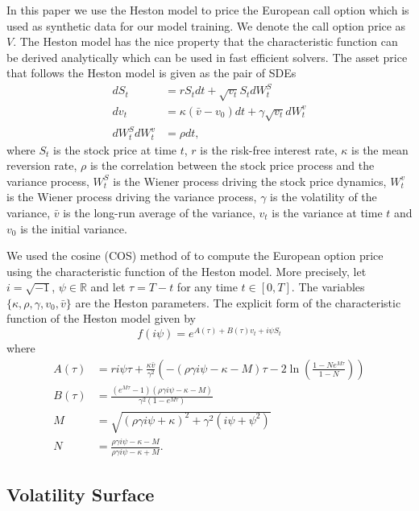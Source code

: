 \documentclass{article}
\theoremstyle{plain}%
\theoremstyle{definition}
\theoremstyle{remark}
\begin{document}
In this paper we use the Heston model to price the European call option which is used as synthetic data for our model training. We denote the call option price as $V$. The Heston model has the nice property that the characteristic function can be derived analytically which can be used in fast efficient solvers.  The asset price that follows the Heston model is given as the pair of SDEs \citep{heston-1993}
\begin{align*}
    dS_t &= r S_tdt +\sqrt{v_t}S_tdW_{t}^S \\
    dv_t &= \kappa(\bar{v} - v_0)dt +\gamma\sqrt{v_t}dW_{t}^v \\
    dW_{t}^S dW_{t}^v &=\rho dt,
\end{align*}
where $S_t$ is the stock price at time $t$, $r$ is the risk-free interest rate, $\kappa$ is the mean reversion rate, $\rho$ is the correlation between the stock price process and the variance process, $W_t^S$ is the Wiener process driving the stock price dynamics, $W_t^v$ is the Wiener process driving the variance process, $\gamma$ is the volatility of the variance, $\bar{v}$ is the long-run average of the variance, $v_t$ is the variance at time $t$ and $v_0$ is the initial variance.

We used the cosine (COS) method of \citep{fang-2009} to compute the European option price using the characteristic function of the Heston model. More precisely, let $i=\sqrt{-1}$, $\psi\in\mathbb{R}$ and let $\tau= T-t$ for any time $t\in[0,T]$.  The variables $\{\kappa,\rho,\gamma,v_0,\bar{v}\}$ are the Heston parameters. The explicit form of the characteristic function of the Heston model given by \citep{dunn-2014}
\[
    f(i\psi) = e^{A(\tau)+B(\tau)v_t+i\psi S_t}
\]
where
\begin{align*}
    A(\tau) &= ri\psi\tau + \frac{\kappa\bar{v}}{\gamma^2}\left(-(\rho\gamma i\psi-\kappa-M)\tau-2\ln\left(\frac{1-Ne^{M\tau}}{1-N}\right)\right)\\
    B(\tau) &= \frac{(e^{M\tau}-1)(\rho\gamma i \psi-\kappa-M)}{\gamma^2(1-e^{M\tau})}\\
    M &= \sqrt{(\rho\gamma i\psi + \kappa)^2+\gamma^2(i\psi + \psi^2)}\\
    N&= \frac{\rho\gamma i \psi -\kappa - M}{\rho\gamma i \psi -\kappa + M}.
\end{align*}

\subsection{Volatility Surface}
\end{document}

